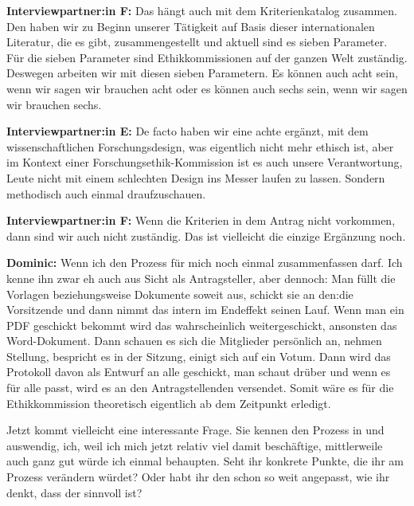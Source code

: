 \documentclass[a4paper,12pt,twoside,numbers=noendperiod]{scrreprt}
\begin{document}
\textbf{Interviewpartner:in F:} Das hängt auch mit dem Kriterienkatalog zusammen. Den haben wir zu Beginn unserer Tätigkeit auf Basis dieser internationalen Literatur, die es gibt, zusammengestellt und aktuell sind es sieben Parameter. Für die sieben Parameter sind Ethikkommissionen auf der ganzen Welt zuständig. Deswegen arbeiten wir mit diesen sieben Parametern. Es können auch acht sein, wenn wir sagen wir brauchen acht oder es können auch sechs sein, wenn wir sagen wir brauchen sechs.

\textbf{Interviewpartner:in E:} De facto haben wir eine achte ergänzt, mit dem wissenschaftlichen Forschungsdesign, was eigentlich nicht mehr ethisch ist, aber im Kontext einer Forschungsethik-Kommission ist es auch unsere Verantwortung, Leute nicht mit einem schlechten Design ins Messer laufen zu lassen. Sondern methodisch auch einmal draufzuschauen.

\textbf{Interviewpartner:in F:} Wenn die Kriterien in dem Antrag nicht vorkommen, dann sind wir auch nicht zuständig. Das ist vielleicht die einzige Ergänzung noch.

\textbf{Dominic:} Wenn ich den Prozess für mich noch einmal zusammenfassen darf. Ich kenne ihn zwar eh auch aus Sicht als Antragsteller, aber dennoch: Man füllt die Vorlagen beziehungsweise Dokumente soweit aus, schickt sie an den:die Vorsitzende und dann nimmt das intern im Endeffekt seinen Lauf. Wenn man ein PDF geschickt bekommt wird das wahrscheinlich weitergeschickt, ansonsten das Word-Dokument. Dann schauen es sich die Mitglieder persönlich an, nehmen Stellung, bespricht es in der Sitzung, einigt sich auf ein Votum. Dann wird das Protokoll davon als Entwurf an alle geschickt, man schaut drüber und wenn es für alle passt, wird es an den Antragstellenden versendet. Somit wäre es für die Ethikkommission theoretisch eigentlich ab dem Zeitpunkt erledigt.

Jetzt kommt vielleicht eine interessante Frage. Sie kennen den Prozess in und auswendig, ich, weil ich mich jetzt relativ viel damit beschäftige, mittlerweile auch ganz gut würde ich einmal behaupten. Seht ihr konkrete Punkte, die ihr am Prozess verändern würdet? Oder habt ihr den schon so weit angepasst, wie ihr denkt, dass der sinnvoll ist?
\end{document}
